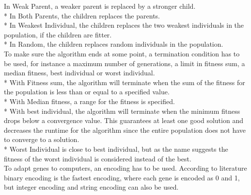 In Weak Parent, a weaker parent is replaced by a stronger child.\\*
In Both Parents, the children replaces the parents.\\*
In Weakest Individual, the children replaces the two weakest individuals in the population, if the children are fitter.\\*
In Random, the children replaces random individuals in the population.\\
To make sure the algorithm ends at some point, a termination condition has to be used, for instance a maximum number of generations, a limit in fitness sum, a median fitness, best individual or worst individual.\\*
With Fitness sum, the algorithm will terminate when the sum of the fitness for the population is less than or equal to a specified value.\\*
With Median fitness, a range for the fitness is specified.\\*
With best individual, the algorithm will terminate when the minimum fitness drops below a convergence value. This guarantees at least one good solution and decreases the runtime for the algorithm since the entire population does not have to converge to a solution.\\*
Worst Individual is close to best individual, but as the name suggests the fitness of the worst individual is  considered instead of the best.\\
To adapt genes to computers, an encoding has to be used.  According to literature \cite{GAHandbook1} binary encoding is the fastest encoding, where each gene is encoded as 0 and 1, but integer encoding and string encoding can also be used.\\
